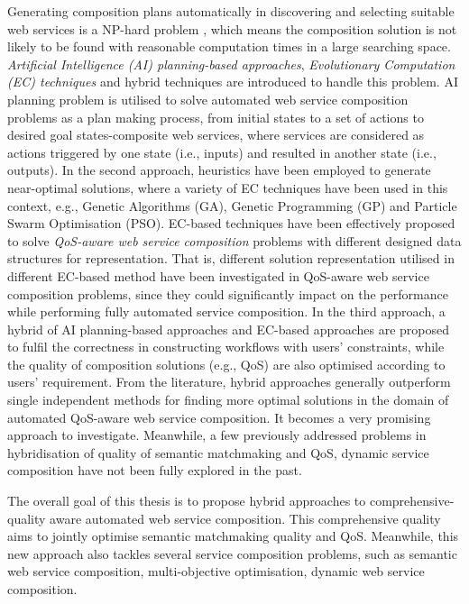 Generating composition plans automatically in discovering and selecting suitable web services is a NP-hard problem \cite{moghaddam2014service}, which means the composition solution is not likely to be found with reasonable computation times in a large searching space. \emph{Artificial Intelligence (AI) planning-based approaches}, \emph{Evolutionary Computation (EC) techniques} and hybrid techniques  are introduced to handle this problem. AI planning problem is utilised to solve automated web service composition problems as a plan making process, from initial states to a set of actions to desired goal states-composite web services, where services are considered as actions triggered by one state (i.e., inputs) and resulted in another state (i.e., outputs). In the second approach, heuristics have been employed to generate near-optimal solutions, where a variety of EC techniques have been used in this context, e.g., Genetic Algorithms (GA), Genetic Programming (GP) and Particle Swarm Optimisation (PSO). EC-based techniques have been effectively proposed to solve \emph{QoS-aware web service composition} problems with different designed data structures for representation. That is, different solution representation utilised in different EC-based method have been investigated in QoS-aware web service composition problems, since they could significantly impact on the performance while performing fully automated service composition. In the third approach, a hybrid of AI planning-based approaches and EC-based approaches \cite{da2016genetic,ma2015hybrid} are proposed to fulfil the correctness in constructing workflows with users' constraints, while the quality of composition solutions (e.g., QoS) are also optimised according to users' requirement. From the literature, hybrid approaches generally outperform single independent methods for finding more optimal solutions in the domain of automated QoS-aware web service composition. It becomes a very promising approach to investigate. Meanwhile, a few previously addressed problems in hybridisation of quality of semantic matchmaking and QoS, dynamic service composition have not been fully explored in the past.

The overall goal of this thesis is to propose hybrid approaches to comprehensive-quality aware automated web service composition. This comprehensive quality aims to jointly optimise semantic matchmaking quality and QoS. Meanwhile, this new approach also tackles several service composition problems, such as semantic web service composition, multi-objective optimisation, dynamic web service composition.

